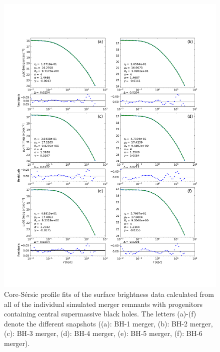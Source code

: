 \documentclass[english, oneside]{HYgradu}
\begin{document}
\begin{figure}
	\centering
	\includegraphics[width=\textwidth]{all_core_profiles.png}
	\caption{Core-Sérsic profile fits of the surface brightness data calculated from all of the individual simulated merger remnants with progenitors containing central supermassive black holes. The letters (a)-(f) denote the different snapshots ((a): BH-1 merger, (b): BH-2 merger, (c): BH-3 merger, (d): BH-4 merger, (e): BH-5 merger, (f): BH-6 merger).}
	\label{figure:all_core}
\end{figure}
\end{document}
